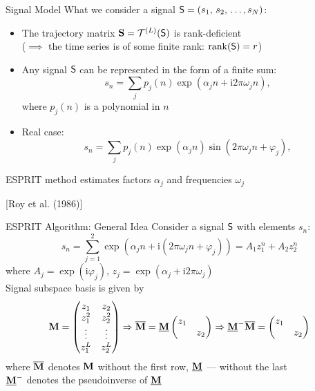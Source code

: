 \documentclass[pdf, unicode, ucs, notheorems]{beamer}
\theoremstyle{definition}
\begin{document}
\begin{frame}{Signal Model}
  What we consider a signal $\mathsf{S} = (s_1,\, s_2,\, \ldots, s_N)$:\smallskip
  \begin{itemize}
    \item The trajectory matrix $\mathbf{S} = \mathcal{T}^{(L)}(\mathsf{S})$ is rank-deficient \\
      ($\implies$ the time series is of some finite rank:
      $\operatorname{rank}(\mathsf{S})=r$)
      \medskip
    \item Any signal $\mathsf{S}$ can be represented in the form of a finite sum:
      \[
        s_n = \sum_{j} p_j(n) \exp(\alpha_j n + \mathrm{i}2\pi
        \omega_j n),
      \]
      where $p_j(n)$ is a polynomial in $n$
      \medskip
    \item Real case:
      \[
        s_n = \sum_{j} p_j(n) \exp(\alpha_j n)\sin(2\pi
        \omega_j n + \varphi_j),
      \]
  \end{itemize}
  \bigskip
  ESPRIT method estimates factors $\alpha_j$ and
  frequencies $\omega_j$

  [Roy et al. (1986)]
\end{frame}

\begin{frame}{ESPRIT Algorithm: General Idea}
  Consider a signal $\mathsf{S}$ with elements $s_n$:
  \[
    s_n = \sum_{j=1}^{2} \exp(\alpha_j n + \mathrm{i}(2\pi
    \omega_j n + \varphi_j)) = A_1 z_1^n + A_2 z_2^n
  \]
  where $A_j = \exp(\mathrm{i} \varphi_j)$, $z_j = \exp(\alpha_j +
  \mathrm{i}2\pi\omega_j)$ \vspace{0.4cm}\\
  Signal subspace basis is given by
  \[
    \mathbf{M} =
    \begin{pmatrix}
      z_1 & z_2 \\
      z_1^2 & z_2^2\\
      \vdots & \vdots \\
      z_1^L & z_2^L
    \end{pmatrix} \Rightarrow \overline{\mathbf{M}} = \underline{\mathbf{M}}
    \begin{pmatrix}
      z_1 & \\ & z_2
    \end{pmatrix}\Rightarrow  \underline{\mathbf{M}}^{-}\overline{\mathbf{M}} =
    \begin{pmatrix}
      z_1 & \\ & z_2
    \end{pmatrix}
  \]
  where $\overline{\mathbf{M}}$ denotes $\mathbf{M}$ without the first row,
  $\underline{\mathbf{M}}$ --- without the last\\
  $\underline{\mathbf{M}}^{-}$ denotes the pseudoinverse of $\underline{\mathbf{M}}$
\end{frame}
\end{document}

